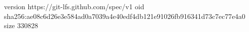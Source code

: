 version https://git-lfs.github.com/spec/v1
oid sha256:ae08c6d26e3e584ad0a7039a4e40edf4db121e91026fb916341d73c7ec77e4a0
size 330828
